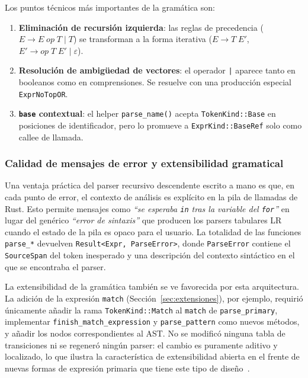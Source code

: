 \documentclass[12pt, a4paper]{article}
\begin{document}
Los puntos t\'{e}cnicos m\'{a}s importantes de la gram\'{a}tica son:

\begin{enumerate}[leftmargin=*, label=\arabic*.]
    \item \textbf{Eliminaci\'{o}n de recursi\'{o}n izquierda}: las reglas de precedencia
          ($E \to E \; op \; T \mid T$) se transforman a la forma iterativa
          ($E \to T \; E'$, $E' \to op \; T \; E' \mid \varepsilon$).
    \item \textbf{Resoluci\'{o}n de ambig\"{u}edad de vectores}: el operador \texttt{|}
          aparece tanto en booleanos como en comprensiones. Se resuelve con una
          producci\'{o}n especial \texttt{ExprNoTopOR}.
    \item \textbf{\texttt{base} contextual}: el helper \texttt{parse\_name()}
          acepta \texttt{TokenKind::Base} en posiciones de identificador, pero
          lo promueve a \texttt{ExprKind::BaseRef} solo como callee de llamada.
\end{enumerate}

\subsubsection{Calidad de mensajes de error y extensibilidad gramatical}

Una ventaja práctica del parser recursivo descendente escrito a mano es que, en
cada punto de error, el contexto de análisis es explícito en la pila de llamadas
de Rust. Esto permite mensajes como \textit{``se esperaba \texttt{in} tras la
variable del \texttt{for}''} en lugar del genérico \textit{``error de sintaxis''}
que producen los parsers tabulares LR cuando el estado de la pila es opaco para
el usuario. La totalidad de las funciones \texttt{parse\_*} devuelven
\texttt{Result<Expr, ParseError>}, donde \texttt{ParseError} contiene el
\texttt{SourceSpan} del token inesperado y una descripción del contexto
sintáctico en el que se encontraba el parser.

La extensibilidad de la gramática también se ve favorecida por esta arquitectura.
La adición de la expresión \texttt{match} (Sección~\ref{sec:extensiones}), por
ejemplo, requirió únicamente añadir la rama \texttt{TokenKind::Match} al
\texttt{match} de \texttt{parse\_primary}, implementar
\texttt{finish\_match\_expression} y \texttt{parse\_pattern} como nuevos métodos,
y añadir los nodos correspondientes al AST. No se modificó ninguna tabla de
transiciones ni se regeneró ningún parser: el cambio es puramente aditivo y
localizado, lo que ilustra la característica de extensibilidad abierta
en el frente de nuevas formas de expresión primaria que tiene este tipo de
diseño~\cite{aho1986}.
\end{document}
